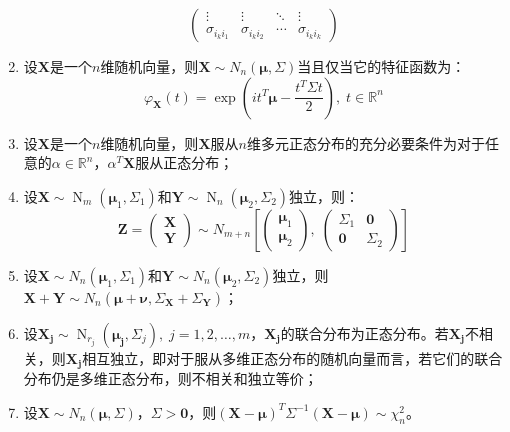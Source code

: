 \begin{property}
\begin{enumerate}
\begin{equation*}
\begin{pmatrix}
				\vdots & \vdots & \ddots & \vdots \\
				\sigma_{i_ki_1} & \sigma_{i_ki_2} & \cdots & \sigma_{i_ki_k}
			\end{pmatrix}
		\end{equation*}
		\item 设$\mathbf{X}$是一个$n$维随机向量，则$\mathbf{X}\sim N_n(\boldsymbol{\mu},\Sigma)$当且仅当它的特征函数为：
		\begin{equation*}
			\varphi_\mathbf{X}(t)=\exp\left(it^T\boldsymbol{\mu}-\frac{t^T\Sigma t}{2}\right),\;t\in\mathbb{R}^{n}
		\end{equation*}
		\item 设$\mathbf{X}$是一个$n$维随机向量，则$\mathbf{X}$服从$n$维多元正态分布的充分必要条件为对于任意的$\alpha\in\mathbb{R}^{n}$，$\alpha^T\mathbf{X}$服从正态分布；
		\item 设$\mathbf{X}\sim\operatorname{N}_m(\boldsymbol{\mu}_1,\Sigma_1)$和$\mathbf{Y}\sim\operatorname{N}_n(\boldsymbol{\mu}_2,\Sigma_2)$独立，则：
		\begin{equation*}
			\mathbf{Z}=
			\begin{pmatrix}
				\mathbf{X} \\
				\mathbf{Y}
			\end{pmatrix}
			\sim N_{m+n}\left[
			\begin{pmatrix}
				\boldsymbol{\mu}_{1} \\
				\boldsymbol{\mu}_{2}
			\end{pmatrix},\;
			\begin{pmatrix}
				\Sigma_1 & \mathbf{0} \\
				\mathbf{0} & \Sigma_2
			\end{pmatrix}
			\right]
		\end{equation*}
		\item 设$\mathbf{X}\sim N_n(\boldsymbol{\mu}_1,\Sigma_1)$和$\mathbf{Y}\sim N_n(\boldsymbol{\mu}_2,\Sigma_2)$独立，则$\mathbf{X}+\mathbf{Y}\sim N_n(\boldsymbol{\mu}+\boldsymbol{\nu},\Sigma_\mathbf{X}+\Sigma_\mathbf{Y})$；
		\item 设$\mathbf{X_j}\sim\operatorname{N}_{r_j}(\boldsymbol{\mu_j},\Sigma_{j}),\;j=1,2,\dots,m$，$\mathbf{X_j}$的联合分布为正态分布。若$\mathbf{X_j}$不相关，则$\mathbf{X_j}$相互独立，即对于服从多维正态分布的随机向量而言，若它们的联合分布仍是多维正态分布，则不相关和独立等价；
		\item 设$\mathbf{X}\sim N_n(\boldsymbol{\mu},\Sigma)$，$\Sigma>\mathbf{0}$，则$(\mathbf{X}-\boldsymbol{\mu})^T\Sigma^{-1}(\mathbf{X}-\boldsymbol{\mu})\sim\chi_n^2$。
	\end{enumerate}
\end{property}
